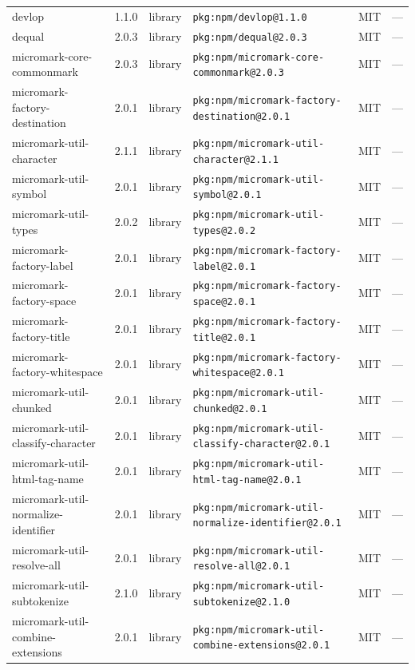 \documentclass[11pt]{article}
\begin{document}
\begin{longtable}{|l|l|l|p{2.2cm}|l|p{4cm}|}
devlop & 1.1.0 & library & \texttt{pkg:npm/devlop@1.1.0} & MIT & — \\
dequal & 2.0.3 & library & \texttt{pkg:npm/dequal@2.0.3} & MIT & — \\
micromark-core-commonmark & 2.0.3 & library & \texttt{pkg:npm/micromark-core-commonmark@2.0.3} & MIT & — \\
micromark-factory-destination & 2.0.1 & library & \texttt{pkg:npm/micromark-factory-destination@2.0.1} & MIT & — \\
micromark-util-character & 2.1.1 & library & \texttt{pkg:npm/micromark-util-character@2.1.1} & MIT & — \\
micromark-util-symbol & 2.0.1 & library & \texttt{pkg:npm/micromark-util-symbol@2.0.1} & MIT & — \\
micromark-util-types & 2.0.2 & library & \texttt{pkg:npm/micromark-util-types@2.0.2} & MIT & — \\
micromark-factory-label & 2.0.1 & library & \texttt{pkg:npm/micromark-factory-label@2.0.1} & MIT & — \\
micromark-factory-space & 2.0.1 & library & \texttt{pkg:npm/micromark-factory-space@2.0.1} & MIT & — \\
micromark-factory-title & 2.0.1 & library & \texttt{pkg:npm/micromark-factory-title@2.0.1} & MIT & — \\
micromark-factory-whitespace & 2.0.1 & library & \texttt{pkg:npm/micromark-factory-whitespace@2.0.1} & MIT & — \\
micromark-util-chunked & 2.0.1 & library & \texttt{pkg:npm/micromark-util-chunked@2.0.1} & MIT & — \\
micromark-util-classify-character & 2.0.1 & library & \texttt{pkg:npm/micromark-util-classify-character@2.0.1} & MIT & — \\
micromark-util-html-tag-name & 2.0.1 & library & \texttt{pkg:npm/micromark-util-html-tag-name@2.0.1} & MIT & — \\
micromark-util-normalize-identifier & 2.0.1 & library & \texttt{pkg:npm/micromark-util-normalize-identifier@2.0.1} & MIT & — \\
micromark-util-resolve-all & 2.0.1 & library & \texttt{pkg:npm/micromark-util-resolve-all@2.0.1} & MIT & — \\
micromark-util-subtokenize & 2.1.0 & library & \texttt{pkg:npm/micromark-util-subtokenize@2.1.0} & MIT & — \\
micromark-util-combine-extensions & 2.0.1 & library & \texttt{pkg:npm/micromark-util-combine-extensions@2.0.1} & MIT & — \\

\end{longtable}
\end{document}
